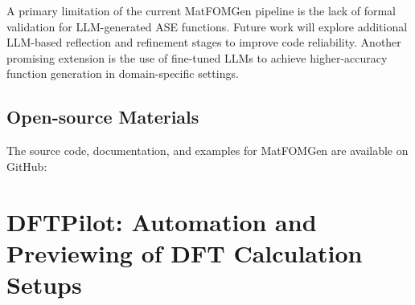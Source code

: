 A primary limitation of the current MatFOMGen pipeline is the lack of formal validation for LLM-generated ASE functions. Future work will explore additional LLM-based reflection and refinement stages to improve code reliability. Another promising extension is the use of fine-tuned LLMs to achieve higher-accuracy function generation in domain-specific settings.


\subsection*{Open-source Materials}

The source code, documentation, and examples for MatFOMGen are available on GitHub:  








\section{DFTPilot: Automation and Previewing of DFT Calculation Setups}

